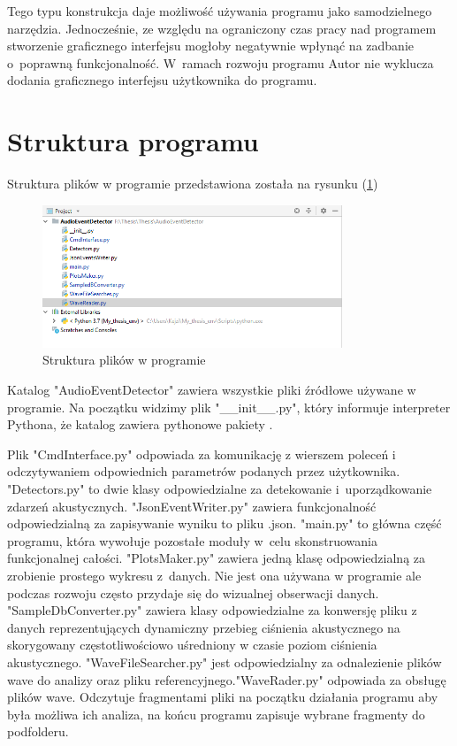 \documentclass[eng,printmode]{mgr}
\begin{document}
Tego typu konstrukcja daje możliwość używania programu jako samodzielnego narzędzia. Jednocześnie, ze względu na ograniczony czas pracy nad programem stworzenie graficznego interfejsu mogłoby negatywnie wpłynąć na zadbanie o~poprawną funkcjonalność. W~ramach rozwoju programu Autor nie wyklucza dodania graficznego interfejsu użytkownika do programu.

\section{Struktura programu}
Struktura plików w programie przedstawiona została na rysunku (\ref{struktura})

\begin{figure}[hbtp]
\label{struktura}
\caption{Struktura plików w programie}
\centering
\includegraphics[width=0.8\textwidth]{struktura.PNG}
\end{figure}

Katalog "AudioEventDetector" zawiera wszystkie pliki źródłowe używane w programie. Na początku widzimy plik "\_\_init\_\_.py", który informuje interpreter Pythona, że 
katalog zawiera pythonowe pakiety \cite{init}. 

Plik "CmdInterface.py" odpowiada za komunikację z wierszem poleceń i odczytywaniem odpowiednich parametrów podanych przez użytkownika. "Detectors.py" to dwie klasy odpowiedzialne za detekowanie i~uporządkowanie zdarzeń akustycznych. "JsonEventWriter.py" zawiera funkcjonalność odpowiedzialną za zapisywanie wyniku to pliku .json. "main.py" to główna część programu, która wywołuje pozostałe moduły w~celu skonstruowania funkcjonalnej całości. "PlotsMaker.py" zawiera jedną klasę odpowiedzialną za zrobienie prostego wykresu z~danych. Nie jest ona używana w programie ale podczas rozwoju często przydaje się do wizualnej obserwacji danych. "SampleDbConverter.py" zawiera klasy odpowiedzialne za konwersję pliku z danych reprezentujących dynamiczny przebieg ciśnienia akustycznego na skorygowany częstotliwościowo uśredniony w czasie poziom ciśnienia akustycznego. "WaveFileSearcher.py" jest odpowiedzialny za odnalezienie plików wave do analizy oraz pliku referencyjnego."WaveRader.py" odpowiada za obsługę plików wave. Odczytuje fragmentami pliki na początku działania programu aby była możliwa ich analiza, na końcu programu zapisuje wybrane fragmenty do podfolderu. 
\end{document}
